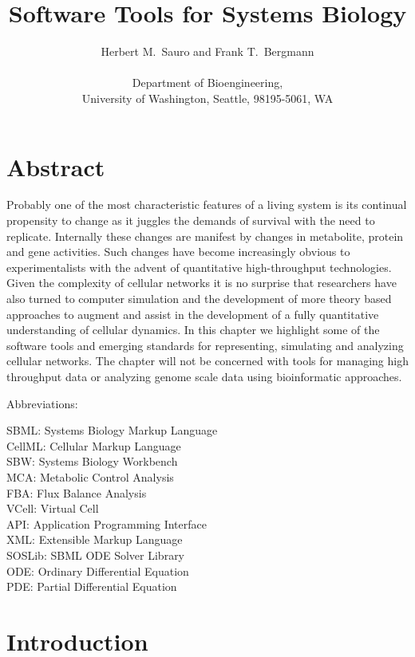 \documentclass[12pt]{article}
\title{Software Tools for Systems Biology}
\author{Herbert M.\ Sauro and Frank T.\ Bergmann \\ \\ Department of Bioengineering, \\ University of Washington, Seattle, 98195-5061, WA}
\begin{document}
\maketitle

\pagebreak

\tableofcontents

\pagebreak

\section*{Abstract}

Probably one of the most characteristic features of a living system is its continual propensity to change as it juggles the demands of survival with the need to replicate. Internally these changes are manifest by changes in metabolite, protein and gene activities. Such changes have become increasingly obvious to experimentalists with the advent of quantitative high-throughput technologies. Given the complexity of cellular networks it is no surprise that researchers have also turned to computer simulation
and the development of more theory based approaches to augment and assist in the development of a fully quantitative understanding of cellular dynamics. In this chapter we highlight some of the software tools and emerging standards for representing, simulating and analyzing cellular networks. The chapter will not be concerned with tools for managing high throughput data or analyzing genome scale data using bioinformatic approaches.

Abbreviations:

SBML: Systems Biology Markup Language \\
CellML: Cellular Markup Language \\
SBW: Systems Biology Workbench \\
MCA: Metabolic Control Analysis \\
FBA: Flux Balance Analysis \\
VCell: Virtual Cell \\
API: Application Programming Interface \\
XML: Extensible Markup Language \\
SOSLib: SBML ODE Solver Library \\
ODE: Ordinary Differential Equation \\
PDE: Partial Differential Equation \\


\pagebreak

\section{Introduction}
\end{document}

